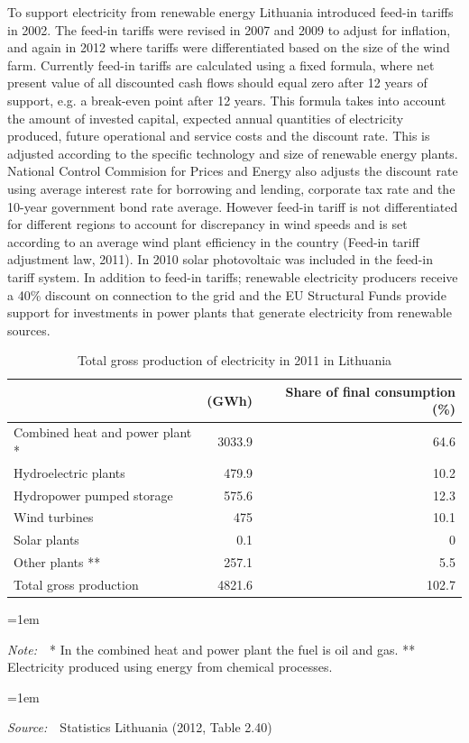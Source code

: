 \documentclass[a4paper, 12pt]{article}
\newcommand{\Figtext}[1]{%
	\begin{tablenotes}[para,flushleft]
		\hangindent=1em
		\footnotesize
		\raggedright
		#1
	\end{tablenotes}
}
\newcommand{\Fignote}[1]{\Figtext{\emph{Note:~}~#1}}
\newcommand{\Figsource}[1]{\Figtext{\emph{Source:~}~#1}}
\begin{document}
To support electricity from renewable energy Lithuania introduced feed-in tariffs in 2002. The feed-in tariffs were revised in 2007 and 2009 to adjust for inflation, and again in 2012 where tariffs were differentiated based on the size of the wind farm. Currently feed-in tariffs are calculated using a fixed formula, where net present value of all discounted cash flows should equal zero after 12 years of support, e.g. a break-even point after 12 years. This formula takes into account the amount of invested capital, expected annual quantities of electricity produced, future operational and service costs and the discount rate. This is adjusted according to the specific technology and size of renewable energy plants. National Control Commision for Prices and Energy also adjusts the discount rate using average interest rate for borrowing and lending, corporate tax rate and the 10-year government bond rate average. However feed-in tariff is not differentiated for different regions to account for discrepancy in wind speeds and is set according to an average wind plant efficiency in the country (Feed-in tariff adjustment law, 2011). In 2010 solar photovoltaic was included in the feed-in tariff system. In addition to feed-in tariffs; renewable electricity producers receive a 40\% discount on connection to the grid and the EU Structural Funds provide support for investments in power plants that generate electricity from renewable sources.

\begin{table}
	\caption{Total gross production of electricity in 2011 in Lithuania}
	\begin{tabular}{p{7.8cm} r r}  
		\hline  	
		 & (GWh) & Share of final consumption (\%) \\
		\hline   
		Combined heat and power plant * & 3033.9 & 64.6 \\
		Hydroelectric plants  & 479.9 & 10.2 \\
		Hydropower pumped storage  & 575.6 & 12.3 \\
		Wind turbines & 475 & 10.1 \\
		Solar plants & 0.1 & 0 \\
		Other plants ** & 257.1 & 5.5 \\
		Total gross production & 4821.6 & 102.7 \\
		\hline   
	\end{tabular}
	\Fignote{* In the combined heat and power plant the fuel is oil and gas. ** Electricity produced using energy from chemical processes.}
	\Figsource{Statistics Lithuania (2012, Table 2.40)}
	\label{tab:table_production-electricity-2011}
\end{table}
\end{document}
